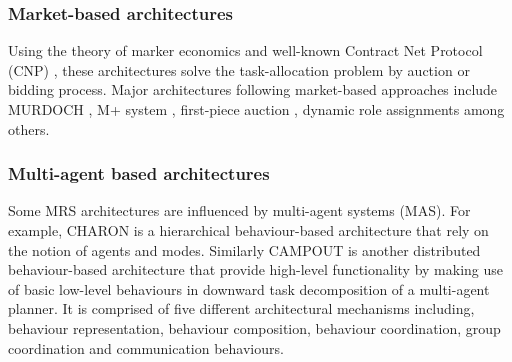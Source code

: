 \subsubsection*{Market-based architectures}
Using the theory of marker economics and well-known Contract Net Protocol (CNP) \cite{Davis1988+}, these architectures solve the task-allocation problem by auction or bidding process. Major architectures following market-based approaches include MURDOCH \cite{Gerkey+2002}, M+ system \cite{Botelho+1999}, first-piece auction \cite{Zlot+2002}, dynamic role assignments \cite{Chaimowicz2002} among others. 
\subsubsection*{Multi-agent based architectures}
Some MRS architectures are influenced by multi-agent systems (MAS). For example, CHARON is a hierarchical behaviour-based architecture that rely on the notion of agents and modes. Similarly CAMPOUT is another distributed behaviour-based architecture that provide high-level functionality by making use of basic low-level behaviours in downward task decomposition of a multi-agent planner. It is comprised of five different architectural mechanisms including, behaviour representation, behaviour composition, behaviour coordination, group coordination and communication behaviours.
